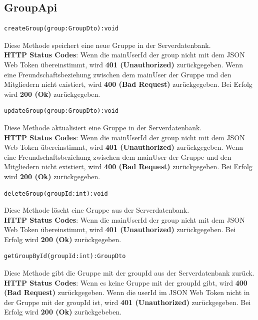 \subsection{GroupApi}

\vspace{1cm}  
 \begin{lstlisting}
createGroup(group:GroupDto):void
\end{lstlisting}
Diese Methode speichert eine neue Gruppe in der Serverdatenbank.\\
\textbf{HTTP Status Codes}:
Wenn die mainUserId der group nicht mit dem JSON Web Token übereinstimmt, wird \textbf{401 (Unauthorized)} zurückgegeben. Wenn eine Freundschaftsbeziehung zwischen dem mainUser der Gruppe und den Mitgliedern nicht existiert, wird \textbf{400 (Bad Request)} zurückgegeben. Bei Erfolg wird \textbf{200 (Ok)} zurückgegeben.
\vspace{1cm}
 \begin{lstlisting}
updateGroup(group:GroupDto):void
\end{lstlisting}
Diese Methode aktualisiert eine Gruppe in der Serverdatenbank.\\
\textbf{HTTP Status Codes}:
Wenn die mainUserId der group nicht mit dem JSON Web Token übereinstimmt, wird \textbf{401 (Unauthorized)} zurückgegeben. Wenn eine Freundschaftsbeziehung zwischen dem mainUser der Gruppe und den Mitgliedern nicht existiert, wird \textbf{400 (Bad Request)} zurückgegeben. Bei Erfolg wird \textbf{200 (Ok)} zurückgegeben.
\vspace{1cm}
 \begin{lstlisting}
deleteGroup(groupId:int):void
\end{lstlisting}
Diese Methode löscht eine Gruppe aus der Serverdatenbank.\\
\textbf{HTTP Status Codes}:
Wenn die mainUserId der group nicht mit dem JSON Web Token übereinstimmt, wird \textbf{401 (Unauthorized)} zurückgegeben. Bei Erfolg wird \textbf{200 (Ok)} zurückgegeben.
\vspace{1cm}  
 \begin{lstlisting}
getGroupById(groupId:int):GroupDto
\end{lstlisting}
Diese Methode gibt die Gruppe mit der groupId aus der Serverdatenbank zurück.\\
\textbf{HTTP Status Codes}:
Wenn es keine Gruppe mit der groupId gibt, wird \textbf{400 (Bad Request)} zurückgegeben. Wenn die userId im JSON Web Token nicht in der Gruppe mit der groupId ist, wird \textbf{401 (Unauthorized)} zurückgegeben. Bei Erfolg wird \textbf{200 (Ok)} zurückgebeben.
